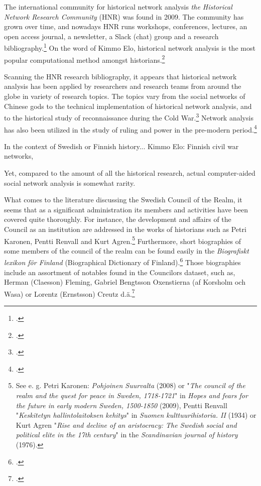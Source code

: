\documentclass[a4paper,12pt]{article}
\begin{document}
The international community for historical network analysis \textit{the Historical Network Research Community} (HNR) was found in 2009. The community has grown over time, and nowadays HNR runs workshops, conferences, lectures, an open access journal, a newsletter, a Slack (chat) group and a research bibliography.\footcite{hnr} On the word of Kimmo Elo, historical network analysis is the most popular computational method amongst historians.\footcite[p. 22.]{elo16} 

Scanning the HNR research bibliography, it appears that historical network analysis has been applied by researchers and research teams from around the globe in variety of research topics. The topics vary from the social networks of Chinese gods to the technical implementation of historical network analysis, and to the historical study of reconnaissance during the Cold War.\footcites[p. 22.]{elo16}{hnrbib} Network analysis has also been utilized in the study of ruling and power in the pre-modern period.\footcite[See e. g. Ruth Ahnert's and Sebastian E. Ahnert's book \textit{Tudor Networks of Power} (2023) or Paul D Mclean's article \textit{Widening Access While Tightening Control: Office-Holding, Marriages, and Elite Consolidation in Early Modern Poland} (2004).]{JonVidarEt}

In the context of Swedish or Finnish history... Kimmo Elo: Finnish civil war networks, 

Yet, compared to the amount of all the historical research, actual computer-aided social network analysis is somewhat rarity.

What comes to the literature discussing the Swedish Council of the Realm, it seems that as a significant administration its members and activities have been covered quite thoroughly. For instance, the development and affairs of the Council as an institution are addressed in the works of historians such as Petri Karonen, Pentti Renvall and Kurt Agren.\footnote{See e. g. Petri Karonen: \textit{Pohjoinen Suurvalta} (2008) or "\textit{The council of the realm and the quest for peace in Sweden, 1718-1721}" in \textit{Hopes and fears for the future in early modern Sweden, 1500-1850} (2009), Pentti Renvall "\textit{Keskitetyn hallintolaitoksen kehitys}" in \textit{Suomen kulttuurihistoria. II} (1934) or Kurt Agren "\textit{Rise and decline of an aristocracy: The Swedish social and political elite in the 17th century}" in the \textit{Scandinavian journal of history} (1976).} Furthermore, short biographies of some members of the council of the realm can be found easily in the \textit{Biografiskt lexikon för Finland} (Biographical Dictionary of Finland).\footcite{blf} Those biographies include an assortment of notables found in the Councilors dataset, such as, Herman (Claesson) Fleming, Gabriel Bengtsson Oxenstierna (af Korsholm och Wasa) or Lorentz (Ernstsson) Creutz d.ä.\footcite{blf-list}
\end{document}
